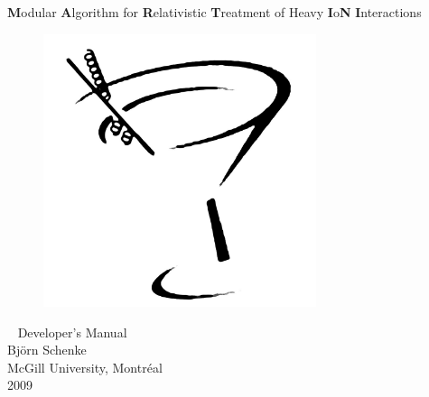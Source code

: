 \begin{titlepage}
  \vspace*{3cm}
  \begin{center}

    \Huge 
    \textbf{M}odular \textbf{A}lgorithm for \textbf{R}elativistic \textbf{T}reatment of Heavy \textbf{I}o\textbf{N}
    \textbf{I}nteractions\\

    \begin{figure}[H]
      \begin{center}
        \includegraphics[width=8cm]{martini}
        \label{fig:title}
      \end{center}

    \end{figure} ~
    \vspace{1.5cm}
     Developer's Manual\\
    \vspace{1.5cm}
    \LARGE
    Bj\"orn Schenke\\
   \vspace{0.2cm}
    McGill University, Montr\'{e}al \\
   \vspace{0.1cm}
    2009
    \vspace{5cm}
    
  \end{center}
  \normalsize
  \vfill
\end{titlepage}

